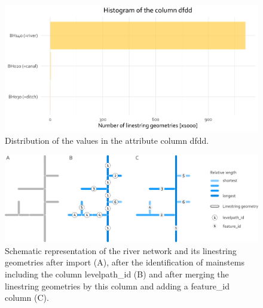 \documentclass[fleqn,10pt]{wlscirep}
\begin{document}
\normalsize

\small

\begin{figure}[H]

{\centering \includegraphics[width=0.8\linewidth]{data_descriptor/tex/figure-dfddstatsbarplot-1} 

}

\caption{Distribution of the values in the attribute column dfdd.}\label{fig:dfddstatsbarplot}
\end{figure}

\normalsize

\small

\begin{figure}[H]

{\centering \includegraphics[width=1\linewidth]{data_descriptor/tex/mainstem_scheme} 

}

\caption{Schematic representation of the river network and its linestring geometries after import (A), after the identification of mainstems including the column levelpath\_id (B) and after merging the linestring geometries by this column and adding a feature\_id column (C).}\label{fig:mainstemscheme}
\end{figure}

\normalsize

\small
\end{document}
